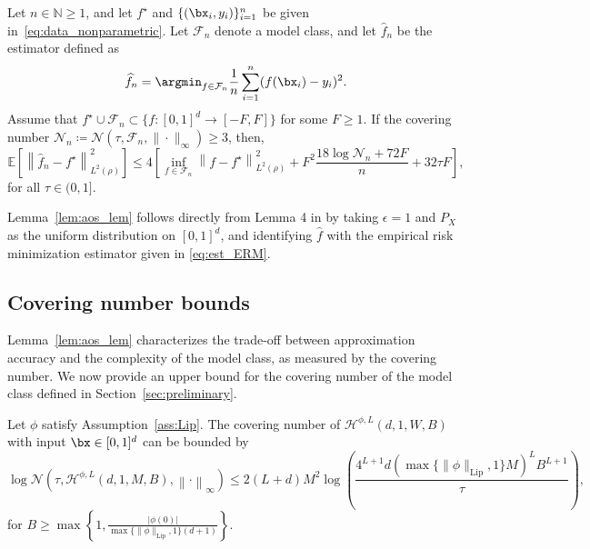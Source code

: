 \documentclass[11pt]{article}
\begin{document}
\begin{lemma}
    Let $n \in \mathbb{N}{\geq 1}$, and let $f^{\star}$ and $\{(\bx_i, y_i)\}_{i=1}^n$ be given in~\eqref{eq:data_nonparametric}. Let $\mathcal{F}_n$ denote a model class, and let $\widehat{f}_n$ be the estimator defined as 
    \begin{equation}
        \widehat{f}_n =  \argmin_{f \in \mathcal{F}_n}  \frac{1}{n} \sum_{i=1}^n (f(\bx_i) - y_i)^2.
        \label{eq:est_ERM}
    \end{equation}
    Assume that ${f^{\star}} \cup \mathcal{F}_n \subset \{f:[0,1]^d \to [-F, F]\}$ for some $F \geq 1$. If the covering number $\mathcal{N}_n \coloneqq  \mathcal{N}(\tau, \mathcal{F}_n, \|\cdot\|_{\infty}) \ge 3 $, then, 
    \begin{equation*}
        \mathbb{E} \left[ \left\| \widehat{f}_n - f^{\star}\right\|_{L^2(\rho)}^2\right] \leq 4 \left[ \inf_{f \in \mathcal{F}_n}  \left\| f - f^{\star} \right\|_{L^2(\rho)}^2 + F^2 \frac{18 \log \mathcal{N}_n + 72 F}{n} + 32 \tau F\right],
    \end{equation*}
    for all $\tau \in (0,1]$.
    \label{lem:aos_lem}
\end{lemma}
\begin{remark}
    Lemma~\ref{lem:aos_lem} follows directly from Lemma 4 in \citet{schmidt2020nonparametric} by taking $\epsilon = 1$ and $P_X$ as the uniform distribution on $[0,1]^d$, and identifying $\widehat{f}$ with the empirical risk minimization estimator given in \eqref{eq:est_ERM}.
\end{remark}

\subsection{Covering number bounds}

Lemma~\ref{lem:aos_lem} characterizes the trade-off between approximation accuracy and the complexity of the model class, as measured by the covering number. We now provide an upper bound for the covering number of the model class defined in Section~\ref{sec:preliminary}.

\begin{lemma}
    Let $\phi$ satisfy Assumption~\ref{ass:Lip}.  The covering number of $\mathcal{H}^{\phi,L}(d, 1, W, B)$ with input $\bx \in [0,1]^d$
    can be bounded by 
    \begin{equation}
        \log \mathcal{N}(\tau, \mathcal{H}^{\phi,L}(d, 1, M, B), \left\|\cdot\right\|_\infty) \leq 2 (L + d) M^2 \log \left( \frac{4^{L+1} d( \max \{\|\phi\|_{\mathrm{Lip}},1 \} M)^{L} B^{L+1}}{\tau}\right),
        \label{eq:covering_entropy_bound}
    \end{equation}
    for $B \geq \max \left\{ 1, \frac{|\phi(0)|}{\max\{\|\phi\|_{\mathrm{Lip}},1\}(d+1)}\right\}$.
    \label{lem:covering_number}
\end{lemma}
\end{document}
